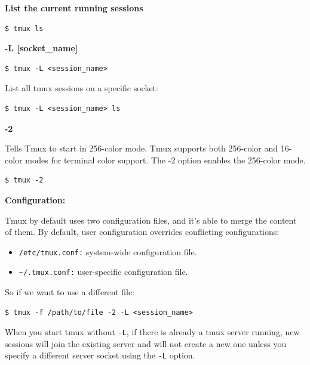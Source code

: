 \documentclass{article}
\newenvironment{blocktemplateIII}[1]{%
    \tcolorbox[beamer,%
    noparskip,breakable,
    ,colframe=Red,%
    colbacklower=LimeGreen!75!LightGreen,%
    title=#1]}%
    {\endtcolorbox}
\newenvironment{codetemplate}[1][]{%
  \mybasecolorbox[#1]
  \itshape
}{%
  \endmybasecolorbox
}
\begin{document}
\textbf{List the current running sessions}
\begin{codetemplate}
\begin{verbatim}
$ tmux ls
\end{verbatim}
\end{codetemplate}

\textbf{-L [socket\_name]}

\begin{codetemplate}
\begin{verbatim}
$ tmux -L <session_name>
\end{verbatim}
\end{codetemplate}

List all tmux sessions on a specific socket:
\begin{codetemplate}
\begin{verbatim}
$ tmux -L <session_name> ls
\end{verbatim}
\end{codetemplate}

\textbf{-2}

Tells Tmux to start in 256-color mode. Tmux supports both 256-color and 16-color modes for terminal color support. The -2 option enables the 256-color mode.

\begin{codetemplate}
\begin{verbatim}
$ tmux -2
\end{verbatim}
\end{codetemplate}

\textbf{Configuration:}

Tmux by default uses two configuration files, and it's able to merge the content of them. By default, user configuration overrides conflicting configurations:
\begin{itemize}
    \item \verb|/etc/tmux.conf:| system-wide configuration file.
    \item \verb|~/.tmux.conf:| user-specific configuration file.
\end{itemize}

So if we want to use a different file:
\begin{codetemplate}
\begin{verbatim}
$ tmux -f /path/to/file -2 -L <session_name>
\end{verbatim}
\end{codetemplate}

\begin{blocktemplateIII}{Warning}
When you start tmux without \verb|-L|, if there is already a tmux server running, new sessions will join the existing server and will not create a new one unless you specify a different server socket using the \verb|-L| option.
\end{blocktemplateIII}
\end{document}
